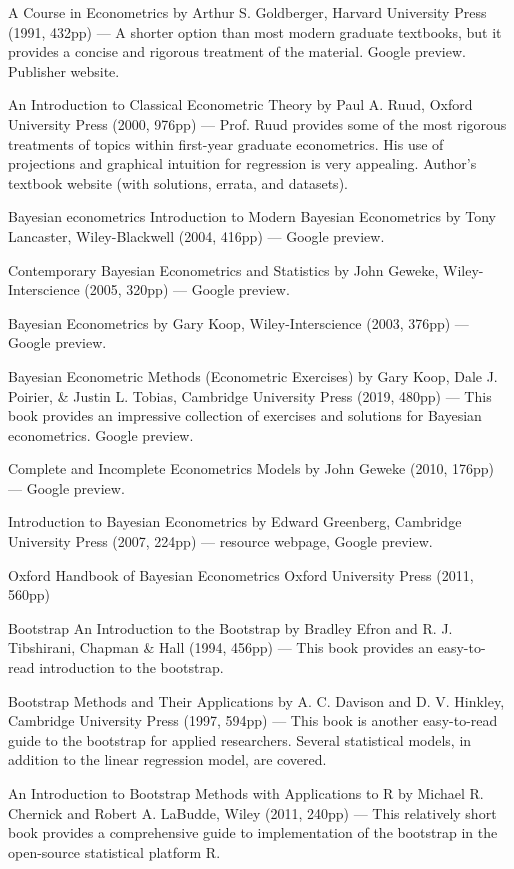 A Course in Econometrics by Arthur S. Goldberger, Harvard University Press (1991, 432pp) --- A shorter option than most modern graduate textbooks, but it provides a concise and rigorous treatment of the material.  Google preview.  Publisher website.

An Introduction to Classical Econometric Theory by Paul A. Ruud, Oxford University Press (2000, 976pp) --- Prof. Ruud provides some of the most rigorous treatments of topics within first-year graduate econometrics.  His use of projections and graphical intuition for regression is very appealing.  Author's textbook website (with solutions, errata, and datasets).

Bayesian econometrics
Introduction to Modern Bayesian Econometrics by Tony Lancaster, Wiley-Blackwell (2004, 416pp) --- Google preview.

Contemporary Bayesian Econometrics and Statistics by John Geweke, Wiley-Interscience (2005, 320pp) --- Google preview.

Bayesian Econometrics by Gary Koop, Wiley-Interscience (2003, 376pp) --- Google preview.

Bayesian Econometric Methods (Econometric Exercises) by Gary Koop, Dale J. Poirier, & Justin L. Tobias, Cambridge University Press (2019, 480pp) ---  This book provides an impressive collection of exercises and solutions for Bayesian econometrics.  Google preview.

Complete and Incomplete Econometrics Models by John Geweke (2010, 176pp) --- Google preview.

Introduction to Bayesian Econometrics by Edward Greenberg, Cambridge University Press (2007, 224pp) --- resource webpage, Google preview.

Oxford Handbook of Bayesian Econometrics Oxford University Press (2011, 560pp)

Bootstrap
An Introduction to the Bootstrap by Bradley Efron and R. J. Tibshirani, Chapman & Hall (1994, 456pp) --- This book provides an easy-to-read introduction to the bootstrap.

Bootstrap Methods and Their Applications by A. C. Davison and D. V. Hinkley, Cambridge University Press (1997, 594pp) --- This book is another easy-to-read guide to the bootstrap for applied researchers.  Several statistical models, in addition to the linear regression model, are covered.

An Introduction to Bootstrap Methods with Applications to R by Michael R. Chernick and Robert A. LaBudde, Wiley (2011, 240pp) --- This relatively short book provides a comprehensive guide to implementation of the bootstrap in the open-source statistical platform R.

